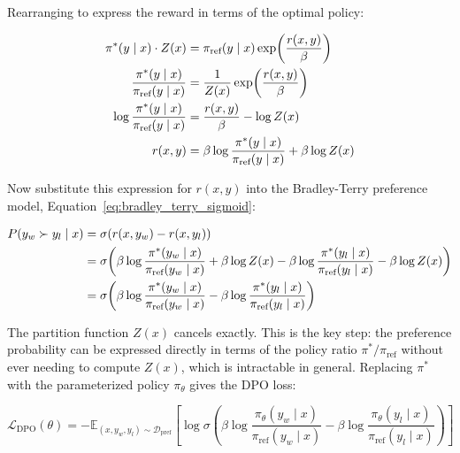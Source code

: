 \documentclass{book}
\begin{document}
Rearranging to express the reward in terms of the optimal policy:

\begin{align}
\pi^*(y \mid x) \cdot Z(x)
    &= \pi_{\text{ref}}(y \mid x)
        \exp\!\left(\frac{r(x,y)}{\beta}\right) \notag \\
\frac{\pi^*(y \mid x)}{\pi_{\text{ref}}(y \mid x)}
    &= \frac{1}{Z(x)} \exp\!\left(\frac{r(x,y)}{\beta}\right) \notag \\
\log \frac{\pi^*(y \mid x)}{\pi_{\text{ref}}(y \mid x)}
    &= \frac{r(x,y)}{\beta} - \log Z(x) \notag \\
r(x, y)
    &= \beta \log \frac{\pi^*(y \mid x)}{\pi_{\text{ref}}(y \mid x)}
        + \beta \log Z(x)
\label{eq:reward_from_policy}
\end{align}

Now substitute this expression for $r(x, y)$ into the Bradley-Terry
preference model, Equation~\ref{eq:bradley_terry_sigmoid}:

\begin{align}
P(y_w \succ y_l \mid x)
&= \sigma(r(x, y_w) - r(x, y_l)) \notag \\
&= \sigma\!\left(
    \beta \log \frac{\pi^*(y_w \mid x)}{\pi_{\text{ref}}(y_w \mid x)}
    + \beta \log Z(x)
    - \beta \log \frac{\pi^*(y_l \mid x)}{\pi_{\text{ref}}(y_l \mid x)}
    - \beta \log Z(x)
\right) \notag \\
&= \sigma\!\left(
    \beta \log \frac{\pi^*(y_w \mid x)}{\pi_{\text{ref}}(y_w \mid x)}
    - \beta \log \frac{\pi^*(y_l \mid x)}{\pi_{\text{ref}}(y_l \mid x)}
\right)
\label{eq:dpo_preference}
\end{align}

The partition function $Z(x)$ cancels exactly. This is the key step: the
preference probability can be expressed directly in terms of the policy
ratio $\pi^* / \pi_{\text{ref}}$ without ever needing to compute $Z(x)$,
which is intractable in general. Replacing $\pi^*$ with the parameterized
policy $\pi_\theta$ gives the DPO loss:

\begin{equation}
\label{eq:dpo_loss}
\mathcal{L}_{\text{DPO}}(\theta)
= -\mathbb{E}_{(x, y_w, y_l) \sim \mathcal{D}_{\text{pref}}}
    \left[
    \log \sigma\!\left(
        \beta \log \frac{\pi_\theta(y_w \mid x)}
                        {\pi_{\text{ref}}(y_w \mid x)}
        - \beta \log \frac{\pi_\theta(y_l \mid x)}
                          {\pi_{\text{ref}}(y_l \mid x)}
    \right)
    \right]
\end{equation}
\end{document}
